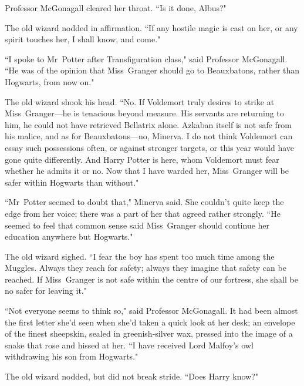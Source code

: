 Professor McGonagall cleared her throat. ``Is it done, Albus?"

The old wizard nodded in affirmation. ``If any hostile magic is cast on her, or any spirit touches her, I shall know, and come."

``I spoke to Mr~Potter after Transfiguration class," said Professor McGonagall. ``He was of the opinion that Miss~Granger should go to Beauxbatons, rather than Hogwarts, from now on."

The old wizard shook his head. ``No. If Voldemort truly desires to strike at Miss~Granger—he is tenacious beyond measure. His servants are returning to him, he could not have retrieved Bellatrix alone. Azkaban itself is not safe from his malice, and as for Beauxbatons—no, Minerva. I do not think Voldemort can essay such possessions often, or against stronger targets, or this year would have gone quite differently. And Harry Potter is here, whom Voldemort must fear whether he admits it or no. Now that I have warded her, Miss~Granger will be safer within Hogwarts than without."

``Mr~Potter seemed to doubt that," Minerva said. She couldn't quite keep the edge from her voice; there was a part of her that agreed rather strongly. ``He seemed to feel that common sense said Miss~Granger should continue her education anywhere but Hogwarts."

The old wizard sighed. ``I fear the boy has spent too much time among the Muggles. Always they reach for safety; always they imagine that safety can be reached. If Miss~Granger is not safe within the centre of our fortress, she shall be no safer for leaving it."

``Not everyone seems to think so," said Professor McGonagall. It had been almost the first letter she'd seen when she'd taken a quick look at her desk; an envelope of the finest sheepskin, sealed in greenish-silver wax, pressed into the image of a snake that rose and hissed at her. ``I have received Lord Malfoy's owl withdrawing his son from Hogwarts."

The old wizard nodded, but did not break stride. ``Does Harry know?"

